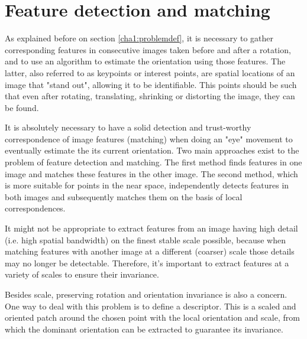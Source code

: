 
\section{Feature detection and matching}
\label{cha2:features}

As explained before on section \ref{cha1:problemdef}, it is necessary to gather corresponding features in consecutive images taken before and after a rotation, and to use an algorithm to estimate the orientation using those features. The latter, also referred to as keypoints or interest points, are spatial locations of an image that "stand out", allowing it to be identifiable. This points should be such that even after rotating, translating, shrinking or distorting the image, they can be found.

It is absolutely necessary to have a solid detection and trust-worthy correspondence of image features (matching) when doing an "eye" movement to eventually estimate the its current orientation. Two main approaches exist to the problem of feature detection and matching. The first method finds features in one image and matches these features in the other image. The second method, which is more suitable for points in the near space, independently detects features in both images and subsequently matches them on the basis of local correspondences.

It might not be appropriate to extract features from an image having high detail (i.e. high spatial bandwidth) on the finest stable scale possible, because when matching features with another image at a different (coarser) scale those details may no longer be detectable. Therefore, it's important to extract features at a variety of scales to ensure their invariance. 

Besides scale, preserving rotation and orientation invariance is also a concern. One way to deal with this problem is to define a descriptor. This is a scaled and oriented patch around the chosen point with the local orientation and scale, from which the dominant orientation can be extracted to guarantee its invariance. \cite{multiview}

